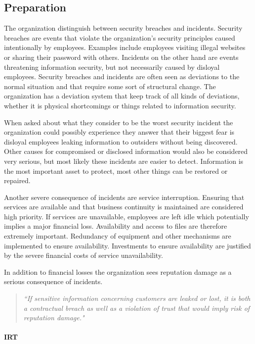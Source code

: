 \subsection{Preparation}
The organization distinguish between security breaches and incidents. Security breaches are events that violate the organization's security principles caused intentionally by employees. Examples include employees visiting illegal websites or sharing their password with others. Incidents on the other hand are events threatening information security, but not necessarily caused by disloyal employees. Security breaches and incidents are often seen as deviations to the normal situation and that require some sort of structural change. The organization has a deviation system that keep track of all kinds of deviations, whether it is physical shortcomings or things related to information security.

When asked about what they consider to be the worst security incident the organization could possibly experience they answer that their biggest fear is disloyal employees leaking information to outsiders without being discovered. Other causes for compromised or disclosed information would also be considered very serious, but most likely these incidents are easier to detect. Information is the most important asset to protect, most other things can be restored or repaired.

Another severe consequence of incidents are service interruption. Ensuring that services are available and that business continuity is maintained are considered high priority. If services are unavailable, employees are left idle which potentially implies a major financial loss. Availability and access to files are therefore extremely important. Redundancy of equipment and other mechanisms are implemented to ensure availability. Investments to ensure availability are justified by the severe financial costs of service unavailability.

In addition to financial losses the organization sees reputation damage as a serious consequence of incidents. 
\begin{quote}
\textit{``If sensitive information concerning customers are leaked or lost, it is both a contractual breach as well as a violation of trust that would imply risk of reputation damage."}
\end{quote}



\paragraph{\acl{IRT}}
